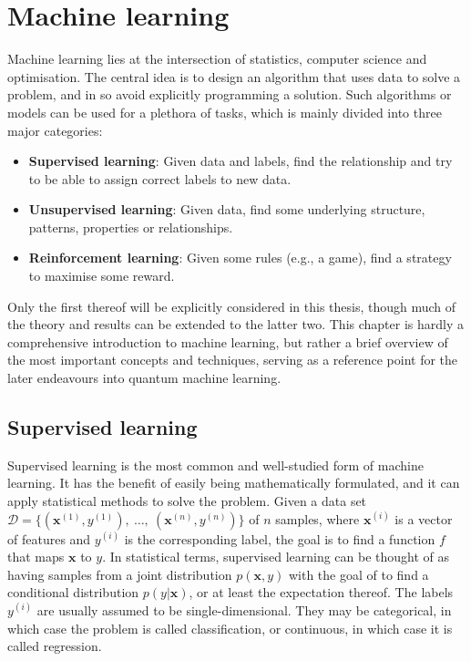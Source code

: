 \chapter{Machine learning}
\label{chap:ml}
Machine learning lies at the intersection of statistics, computer science and optimisation.
The central idea is to design an algorithm that uses data to solve a problem, and in so avoid explicitly programming a solution.
Such algorithms or models can be used for a plethora of tasks, which is mainly divided into three major categories:
\begin{itemize}
	\item \textbf{Supervised learning}: Given data and labels, find the relationship and try to be able to assign correct labels to new data.
	\item \textbf{Unsupervised learning}: Given data, find some underlying structure, patterns, properties or relationships.
	\item \textbf{Reinforcement learning}: Given some rules (e.g., a game), find a strategy to maximise some reward.
\end{itemize}
Only the first thereof will be explicitly considered in this thesis, though much of the theory and results can be extended to the latter two.
This chapter is hardly a comprehensive introduction to machine learning, but rather a brief overview of the most important concepts and techniques, serving as a reference point for the later endeavours into quantum machine learning.

\section{Supervised learning}
Supervised learning is the most common and well-studied form of machine learning.
It has the benefit of easily being mathematically formulated, and it can apply statistical methods to solve the problem.
Given a data set
$
	\mathcal{D} = \{
	(\bm{x}^{(1)}, y^{(1)}), \
	\dots, \
	(\bm{x}^{(n)}, y^{(n)})
	\}
$
of $n$ samples, where $\bm{x}^{(i)}$ is a vector of features and $y^{(i)}$ is the corresponding label, the goal is to find a function $f$ that maps $\bm{x}$ to $y$.
In statistical terms, supervised learning can be thought of as having samples from a joint distribution $p(\bm{x}, y)$ with the goal of to find a conditional distribution $p(y|\bm{x})$, or at least the expectation thereof.
The labels $y^{(i)}$ are usually assumed to be single-dimensional.
They may be categorical, in which case the problem is called classification, or continuous, in which case it is called regression.

